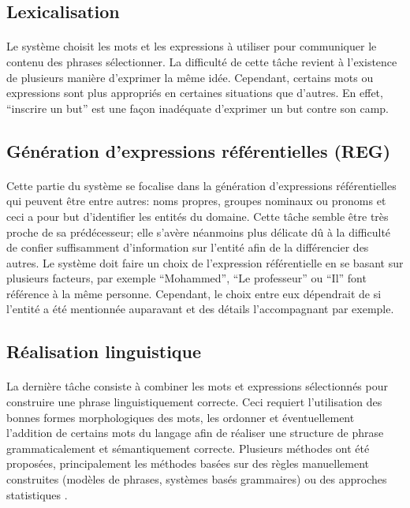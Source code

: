 	\subsection{Lexicalisation}
	\paragraph{}Le système choisit les mots et les expressions à utiliser pour communiquer le contenu des phrases sélectionner. La difficulté de cette tâche revient à l’existence de plusieurs manière d’exprimer la même idée. Cependant, certains mots ou expressions sont plus appropriés en certaines situations que d’autres. En effet, “inscrire un but” est une façon inadéquate d’exprimer un but contre son camp\cite{Gatt2018}.
	
	\subsection{Génération d’expressions référentielles (REG)}
	\paragraph{}Cette partie du système se focalise dans la génération d’expressions référentielles qui peuvent être entre autres: noms propres, groupes nominaux ou pronoms et ceci a pour but d’identifier les entités du domaine. Cette tâche semble être très proche de sa prédécesseur; elle s’avère néanmoins plus délicate dû à la difficulté de confier suffisamment d’information sur l’entité afin de la différencier des autres\cite{Reiter:1997}. Le système doit faire un choix de l’expression référentielle en se basant sur plusieurs facteurs, par exemple “Mohammed”, “Le professeur” ou “Il” font référence à la même personne. Cependant, le choix entre eux dépendrait de si l’entité a été mentionnée auparavant et des détails l’accompagnant par exemple. 
	
	\subsection{Réalisation linguistique}
	\paragraph{}
	La dernière tâche consiste à combiner les mots et expressions sélectionnés pour construire une phrase linguistiquement correcte. Ceci requiert l’utilisation des bonnes formes morphologiques des mots, les ordonner et éventuellement  l’addition de certains mots du langage afin de réaliser une structure de phrase grammaticalement et sémantiquement correcte. Plusieurs méthodes ont été proposées, principalement les méthodes basées sur des règles manuellement construites (modèles de phrases, systèmes basés grammaires) ou des approches statistiques \cite{Gatt2018}.
